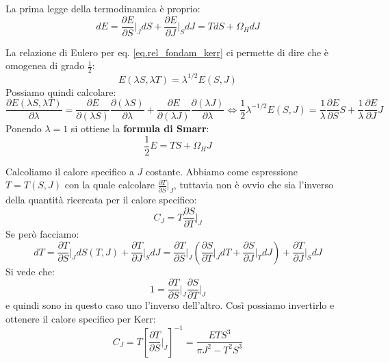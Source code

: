 La prima legge della termodinamica è proprio:
\begin{equation}
    dE = \frac{\partial E}{\partial S}\Big|_J dS + \frac{\partial E}{\partial J}\Big|_S dJ = TdS + \Omega_H dJ
    \label{eq.prima_legge_kerr}
\end{equation}

La relazione di Eulero per eq. \ref{eq.rel_fondam_kerr} ci permette di dire che è omogenea di grado $\frac{1}{2}$:
\begin{equation*}
    E(\lambda S, \lambda T) = \lambda^{1/2} E(S,J)
\end{equation*}
Possiamo quindi calcolare:
\begin{equation*}
    \frac{\partial E(\lambda S, \lambda T)}{\partial \lambda} = \frac{\partial E}{\partial(\lambda S)} \frac{\partial(\lambda S)}{\partial \lambda} + \frac{\partial E}{\partial (\lambda J)}\frac{\partial( \lambda J)}{\partial \lambda}\iff \frac{1}{2}\lambda^{-1/2}E(S,J) = \frac{1}{\lambda}\frac{\partial E}{\partial S}S + \frac{1}{\lambda}\frac{\partial E}{\partial J}J
\end{equation*}
Ponendo $\lambda = 1$ si ottiene la \textbf{formula di Smarr}:
\begin{equation}
    \frac{1}{2}E = TS + \Omega_H J
    \label{eq.smarr_kerr}
\end{equation}

Calcoliamo il calore specifico a $J$ costante. Abbiamo come espressione $T=T(S,J)$ con la quale calcolare $\frac{\partial T}{\partial S}\Big|_J$, tuttavia non è ovvio che sia l'inverso della quantità ricercata per il calore specifico:
\begin{equation*}
    C_J = T \frac{\partial S}{\partial T}\Big|_J
\end{equation*}
Se però facciamo:
\begin{equation*}
    dT = \frac{\partial T}{\partial S}\Big|_J dS(T,J) + \frac{\partial T}{\partial J}\Big|_S dJ = \frac{\partial T}{\partial S}\Big|_J \left( \frac{\partial S}{\partial T}\Big|_J dT + \frac{\partial S}{\partial J}\Big|_T dJ \right) + \frac{\partial T}{\partial J}\Big|_S dJ 
\end{equation*}
Si vede che:
\begin{equation*}
    1= \frac{\partial T}{\partial S}\Big|_J \frac{\partial S}{\partial T}\Big|_J
\end{equation*}
e quindi sono in questo caso uno l'inverso dell'altro. Così possiamo invertirlo e ottenere il calore specifico per Kerr:
\begin{equation}
    C_J = T\left[ \frac{\partial T}{\partial S}\Big|_J\right]^{-1} = \frac{ETS^3}{\pi J^2 - T^2S^3}
    \label{eq.calore_specifico_kerr}
\end{equation}


